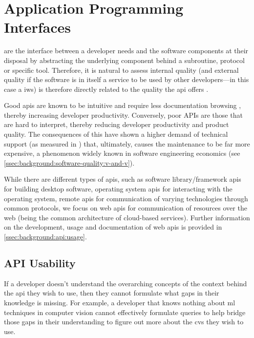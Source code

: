 \section{Application Programming Interfaces}
\label{sec:background:api}

 are the interface between a developer needs and the software components at their disposal \citep{Arnold:2005vc} by abstracting the underlying component behind a subroutine, protocol or specific tool. Therefore, it is natural to assess internal quality (and external quality if the software is in itself a service to be used by other developers---in this case a \gls{iws}) is therefore directly related to the quality the \gls{api} offers \citep{Ko:2004td}. 

Good \glspl{api} are known to be intuitive and require less documentation browsing \citep{Piccioni:2013em}, thereby increasing developer productivity. Conversely, poor APIs are those that are hard to interpret, thereby reducing developer productivity and product quality. The consequences of this have shown a higher demand of technical support (as measured in \citep{Henning:2009hz}) that, ultimately, causes the maintenance to be far more expensive, a phenomenon widely known in software engineering economics (see \cref{ssec:background:software-quality:v-and-v}).

While there are different types of \glspl{api}, such as software library/framework \glspl{api} for building desktop software, operating system \glspl{api} for interacting with the operating system, remote \glspl{api} for communication of varying technologies through common protocols, we focus on web \glspl{api} for communication of resources over the web (being the common architecture of cloud-based services). Further information on the development, usage and documentation of web \glspl{api} is provided in \cref{ssec:background:api:usage}.


\subsection{API Usability}
\label{ssec:background:api:usability}

If a developer doesn't understand the overarching concepts of the context behind the \gls{api} they wish to use, then they cannot formulate what gaps in their knowledge is missing. For example, a developer that knows nothing about \gls{ml} techniques in computer vision cannot effectively formulate queries to help bridge those gaps in their understanding to figure out more about the \gls{cvs} they wish to use. 

